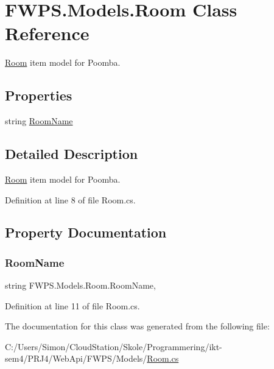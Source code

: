\hypertarget{class_f_w_p_s_1_1_models_1_1_room}{}\section{F\+W\+P\+S.\+Models.\+Room Class Reference}
\label{class_f_w_p_s_1_1_models_1_1_room}


\mbox{\hyperlink{class_f_w_p_s_1_1_models_1_1_room}{Room}} item model for Poomba.  


\subsection*{Properties}
\begin{DoxyCompactItemize}
\item 
string \mbox{\hyperlink{class_f_w_p_s_1_1_models_1_1_room_afa11f7683e83299eb8318b6a548bdc83}{Room\+Name}}
\end{DoxyCompactItemize}


\subsection{Detailed Description}
\mbox{\hyperlink{class_f_w_p_s_1_1_models_1_1_room}{Room}} item model for Poomba. 

Definition at line 8 of file Room.\+cs.



\subsection{Property Documentation}
\mbox{\label{class_f_w_p_s_1_1_models_1_1_room_afa11f7683e83299eb8318b6a548bdc83}} 
\subsubsection{\texorpdfstring{Room\+Name}{RoomName}}
{\footnotesize\ttfamily string F\+W\+P\+S.\+Models.\+Room.\+Room\+Name\hspace{0.3cm}{\ttfamily [get]}, {\ttfamily [set]}}



Definition at line 11 of file Room.\+cs.



The documentation for this class was generated from the following file\+:\begin{DoxyCompactItemize}
\item 
C\+:/\+Users/\+Simon/\+Cloud\+Station/\+Skole/\+Programmering/ikt-\/sem4/\+P\+R\+J4/\+Web\+Api/\+F\+W\+P\+S/\+Models/\mbox{\hyperlink{_web_api_2_f_w_p_s_2_models_2_room_8cs}{Room.\+cs}}\end{DoxyCompactItemize}
